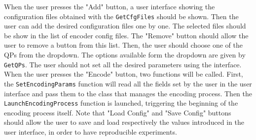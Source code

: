 \documentclass{article}
\begin{document}






When the user presses the "Add" button, a user interface showing the configuration files obtained with the \texttt{GetCfgFiles} should be shown. Then the user can add the desired configuration files one by one. The selected files should be show in the list of encoder config files. The "Remove" button should allow the user to remove a button from this list. Then, the user should choose one of the QPs from the dropdown. The options available form the dropdown are given by \texttt{GetQPs}. The user should not set all the desired parameters using the interface. When the user presses the "Encode" button, two functions will be called. First, the \texttt{SetEncodingParams} function will read all the fields set by the user in the user interface and pass them to the class that manages the encoding process. Then the \texttt{LaunchEncodingProcess} function is launched, triggering the beginning of the encoding process itself. Note that "Load Config" and "Save Config" buttons should allow the user to save and load respectively the values introduced in the user interface, in order to have reproducible experiments.
\end{document}
